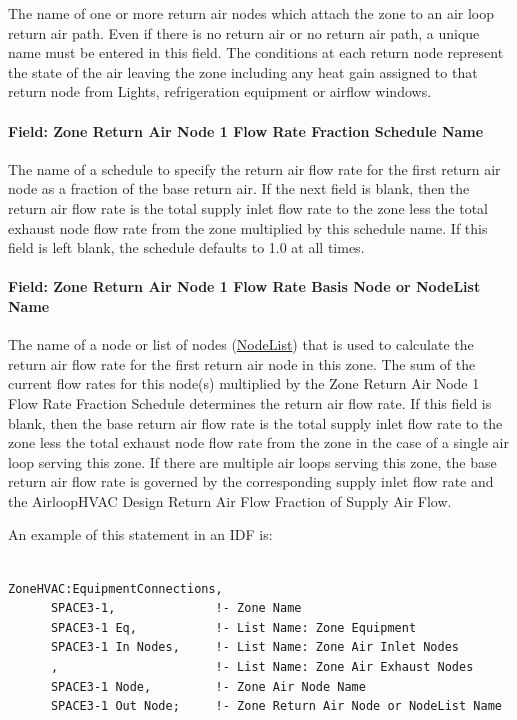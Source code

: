 The name of one or more return air nodes which attach the zone to an air loop return air path. Even if there is no return air or no return air path, a unique name must be entered in this field. The conditions at each return node represent the state of the air leaving the zone including any heat gain assigned to that return node from Lights, refrigeration equipment or airflow windows.

\paragraph{Field: Zone Return Air Node 1 Flow Rate Fraction Schedule Name}\label{field-zone-return-air-flow-rate-fraction-schedule-name}

The name of a schedule to specify the return air flow rate for the first return air node as a fraction of the base return air. If the next field is blank, then the return air flow rate is the total supply inlet flow rate to the zone less the total exhaust node flow rate from the zone multiplied by this schedule name. If this field is left blank, the schedule defaults to 1.0 at all times.

\paragraph{Field: Zone Return Air Node 1 Flow Rate Basis Node or NodeList Name}\label{field-zone-return-air-flow-rate-basis-node-or-nodelist-name}

The name of a node or list of nodes (\hyperref[nodelist]{NodeList}) that is used to calculate the return air flow rate for the first return air node in this zone. The sum of the current flow rates for this node(s) multiplied by the Zone Return Air Node 1 Flow Rate Fraction Schedule determines the return air flow rate. If this field is blank, then the base return air flow rate is the total supply inlet flow rate to the zone less the total exhaust node flow rate from the zone in the case of a single air loop serving this zone. If there are multiple air loops serving this zone, the base return air flow rate is governed by the corresponding supply inlet flow rate and the AirloopHVAC Design Return Air Flow Fraction of Supply Air Flow.

An example of this statement in an IDF is:

\begin{lstlisting}

ZoneHVAC:EquipmentConnections,
      SPACE3-1,              !- Zone Name
      SPACE3-1 Eq,           !- List Name: Zone Equipment
      SPACE3-1 In Nodes,     !- List Name: Zone Air Inlet Nodes
      ,                      !- List Name: Zone Air Exhaust Nodes
      SPACE3-1 Node,         !- Zone Air Node Name
      SPACE3-1 Out Node;     !- Zone Return Air Node or NodeList Name
\end{lstlisting}

